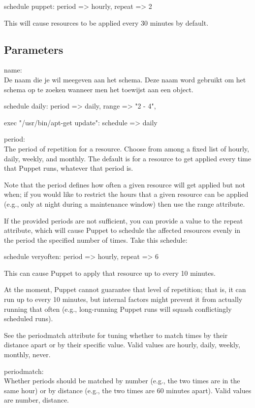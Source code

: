 schedule { puppet:
  period => hourly,
  repeat => 2
}

This will cause resources to be applied every 30 minutes by default.

\subsection{Parameters}

name:\\
De naam die je wil meegeven aan het schema. Deze naam word gebruikt om het schema op te zoeken wanneer men het toewijst aan een object.

schedule { daily:
  period => daily,
  range => "2 - 4",
}
  
exec { "/usr/bin/apt-get update":
  schedule => daily
}

period:\\
The period of repetition for a resource. Choose from among a fixed list of hourly, daily, weekly, and monthly. The default is for a resource to get applied every time that Puppet runs, whatever that period is.

Note that the period defines how often a given resource will get applied but not when; if you would like to restrict the hours that a given resource can be applied (e.g., only at night during a maintenance window) then use the range attribute.

If the provided periods are not sufficient, you can provide a value to the repeat attribute, which will cause Puppet to schedule the affected resources evenly in the period the specified number of times. Take this schedule:

schedule { veryoften:
  period => hourly,
  repeat => 6
}

This can cause Puppet to apply that resource up to every 10 minutes.

At the moment, Puppet cannot guarantee that level of repetition; that is, it can run up to every 10 minutes, but internal factors might prevent it from actually running that often (e.g., long-running Puppet runs will squash conflictingly scheduled runs).

See the periodmatch attribute for tuning whether to match times by their distance apart or by their specific value. Valid values are hourly, daily, weekly, monthly, never.

periodmatch:\\
Whether periods should be matched by number (e.g., the two times are in the same hour) or by distance (e.g., the two times are 60 minutes apart). Valid values are number, distance.

